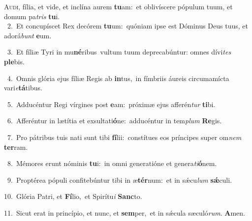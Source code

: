 \lettrine{\initial\textcolor{\initialcolor}{A}}{udi,} fília, et vide, et inclína aurem \textbf{tu}\-am:~\star et oblivíscere pópulum tuum, et domum pa\textit{tris} \textbf{tu}\-i.\\
{\numbfont\textcolor{\numbcolor}{~2.}}~Et concupíscet Rex decórem \textbf{tu}\-um:~\star quóniam ipse est Dóminus Deus tuus, et adorá\textit{bunt} \textbf{e}\-um.\par
{\numbfont\textcolor{\numbcolor}{~3.}}~Et fíliæ Tyri in mu\-\textbf{né}\-ribus~\star vultum tuum deprecabúntur: omnes dívi\textit{tes} \textbf{ple}\-bis.\par
{\numbfont\textcolor{\numbcolor}{~4.}}~Omnis glória ejus fíliæ Regis ab \textbf{in}\-tus,~\star in fímbriis áureis circumamícta vari\-\textit{e}\-\textbf{tá}tibus.\par
{\numbfont\textcolor{\numbcolor}{~5.}}~Adducéntur Regi vírgines post \textbf{e}\-am:~\star próximæ ejus afferén\textit{tur} \textbf{ti}\-bi.\par
{\numbfont\textcolor{\numbcolor}{~6.}}~Afferéntur in lætítia et exsultati\-\textbf{ó}\-ne:~\star adducéntur in tem\textit{plum} \textbf{Re}\-gis.\par
{\numbfont\textcolor{\numbcolor}{~7.}}~Pro pátribus tuis nati sunt tibi \textbf{fí}\-lii:~\star constítues eos príncipes super om\textit{nem} \textbf{ter}\-ram.\par
{\numbfont\textcolor{\numbcolor}{~8.}}~Mémores erunt nóminis \textbf{tu}\-i:~\star in omni generatióne et genera\-\textit{ti}\-\textbf{ó}nem.\par
{\numbfont\textcolor{\numbcolor}{~9.}}~Proptérea pópuli confitebúntur tibi in æ\-\textbf{tér}\-num:~\star et in sǽcu\textit{lum} \textbf{sǽ}\-culi.\par
{\numbfont\textcolor{\numbcolor}{10.}}~Glória Patri, et \textbf{Fí}\-lio,~\star et Spirítu\textit{i} \textbf{Sanc}\-to.\par
{\numbfont\textcolor{\numbcolor}{11.}}~Sicut erat in princípio, et nunc, et \textbf{sem}\-per,~\star et in sǽcula sæculó\-\textit{rum}\-. \textbf{A}\-men.\par
